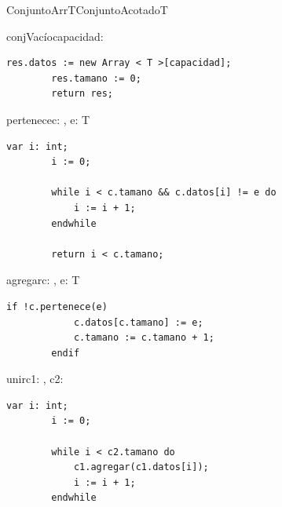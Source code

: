 \pagebreak

\begin{module}{ConjuntoArr}{T}{ConjuntoAcotado}{T}




	\begin{proc}{conjVacío}{\In capacidad: \Int}{\moduletype}
		\begin{lstlisting}[numbers=none,frame=none]
		res.datos := new Array < T >[capacidad];
		res.tamano := 0;
		return res;
		\end{lstlisting}
	\end{proc}

	\begin{proc}{pertenece}{\In c: \moduletype, \In e: T}{\bool}
		\begin{lstlisting}[numbers=none,frame=none]
		var i: int;
		i := 0;

		while i < c.tamano && c.datos[i] != e do
			i := i + 1;
		endwhile

		return i < c.tamano;
		\end{lstlisting}
	\end{proc}

	\begin{proc}{agregar}{\Inout c: \moduletype, \In e: T}{}
		\begin{lstlisting}[numbers=none,frame=none]
		if !c.pertenece(e)
			c.datos[c.tamano] := e;
			c.tamano := c.tamano + 1;
		endif
		\end{lstlisting}
	\end{proc}

	\begin{proc}{unir}{\Inout c1: \moduletype, \In c2: \moduletype}{}
		\begin{lstlisting}[numbers=none,frame=none]
		var i: int;
		i := 0;

		while i < c2.tamano do
			c1.agregar(c1.datos[i]);
			i := i + 1;
		endwhile
		\end{lstlisting}
	\end{proc}


\end{module}
